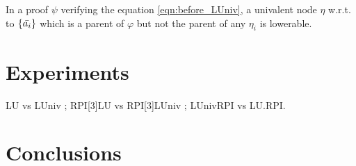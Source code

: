 \documentclass{llncs}
\begin{document}
In a proof $\psi$ verifying the equation \ref{eqn:before_LUniv}, a univalent node $\eta$ w.r.t. to
$\{\bar{a_i}\}$ which is a parent of $\varphi$ but not the parent of any $\eta_i$ is lowerable.


\section{Experiments}



\begin{jb}
LU vs LUniv ; RPI[3]LU vs RPI[3]LUniv ; LUnivRPI vs LU.RPI.
\end{jb}

\section{Conclusions}



\end{document}
